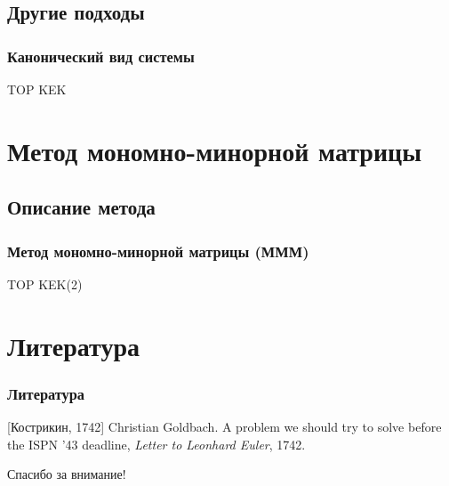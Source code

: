 \documentclass{beamer}
\begin{document}
\subsection{Другие подходы}
\frame
{
	\frametitle{Канонический вид системы}
	TOP KEK
}
\section{Метод мономно-минорной матрицы}
\subsection{Описание метода}
\frame
{
	\frametitle{Метод мономно-минорной матрицы (МММ)}
	TOP KEK(2)
}
\section{Литература}
\frame
{
	\frametitle{Литература}
%	
%	 
	\begin{thebibliography}{10}
  		[Кострикин, 1742]
    	Christian Goldbach.
    	\newblock A problem we should try to solve before the ISPN ’43 deadline,
    	\newblock \emph{Letter to Leonhard Euler}, 1742.
 	\end{thebibliography}
}
\frame
{
	\begin{center}
		\huge Спасибо за внимание!
	\end{center}
}
\end{document}
